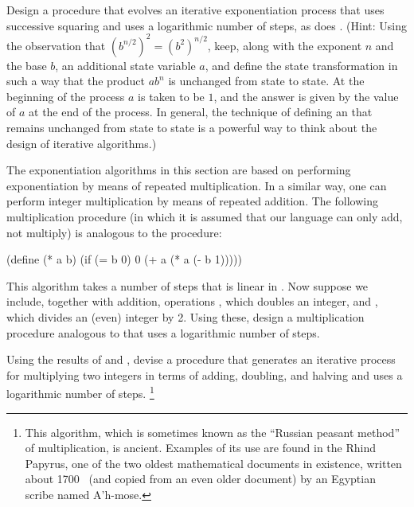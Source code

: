 \begin{exercise}
	\label{Exercise 1.16}
	Design a procedure that evolves an iterative exponentiation process that uses successive squaring and uses a logarithmic number of steps, as does .
	(Hint:
	Using the observation that \( (b^{n / 2})^2 = (b^2)^{n / 2} \), keep, along with the exponent \( n \) and the base \( b \), an additional state variable \( a \), and define the state transformation in such a way that the product \( a b^n \) is unchanged from state to state.
	At the beginning of the process \( a \) is taken to be \( 1 \), and the answer is given by the value of \( a \) at the end of the process.
	In general, the technique of defining an  that remains unchanged from state to state is a powerful way to think about the design of iterative algorithms.)
\end{exercise}



\begin{exercise}
	\label{Exercise 1.17}
	The exponentiation algorithms in this section are based on performing exponentiation by means of repeated multiplication.
	In a similar way, one can perform integer multiplication by means of repeated addition.
	The following multiplication procedure (in which it is assumed that our language can only add, not multiply) is analogous to the  procedure:
	\begin{scheme}
	  (define (* a b)
	    (if (= b 0)
	        0
	        (+ a (* a (- b 1)))))
	\end{scheme}
	This algorithm takes a number of steps that is linear in .
	Now suppose we include, together with addition, operations , which doubles an integer, and , which divides an (even) integer by 2.
	Using these, design a multiplication procedure analogous to  that uses a logarithmic number of steps.
\end{exercise}



\begin{exercise}
	\label{Exercise 1.18}
	Using the results of  and , devise a procedure that generates an iterative process for multiplying two integers in terms of adding, doubling, and halving and uses a logarithmic number of steps.%
	\footnote{
		This algorithm, which is sometimes known as the “Russian peasant method” of multiplication, is ancient.
		Examples of its use are found in the Rhind Papyrus, one of the two oldest mathematical documents in existence, written about 1700~ (and copied from an even older document) by an Egyptian scribe named A’h-mose.
	}
\end{exercise}



